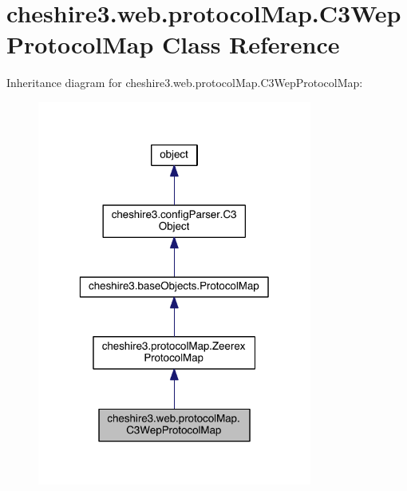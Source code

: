 \hypertarget{classcheshire3_1_1web_1_1protocol_map_1_1_c3_wep_protocol_map}{\section{cheshire3.\-web.\-protocol\-Map.\-C3\-Wep\-Protocol\-Map Class Reference}
\label{classcheshire3_1_1web_1_1protocol_map_1_1_c3_wep_protocol_map}
}


Inheritance diagram for cheshire3.\-web.\-protocol\-Map.\-C3\-Wep\-Protocol\-Map\-:
\nopagebreak
\begin{figure}[H]
\begin{center}
\leavevmode
\includegraphics[width=256pt]{classcheshire3_1_1web_1_1protocol_map_1_1_c3_wep_protocol_map__inherit__graph}
\end{center}
\end{figure}


